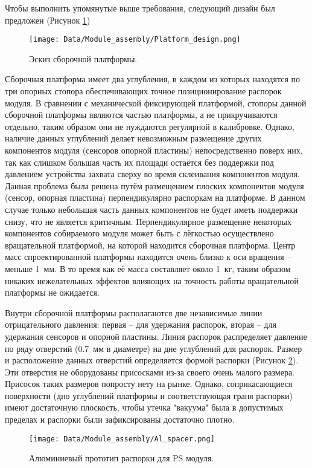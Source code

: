 Чтобы выполнить упомянутые выше требования, следующий дизайн был предложен (Рисунок \ref{fig:platform_design})

\begin{figure}[ht]\centering
\texttt{[image: Data/Module\_assembly/Platform\_design.png]}
\caption{Эскиз сборочной платформы.}
\label{fig:platform_design}
\end{figure}

Сборочная платформа имеет два углубления, в каждом из которых находятся по три опорных стопора обеспечивающих точное позиционирование распорок модуля. В сравнении с механической фиксирующей платформой, стопоры данной сборочной платформы являются частью платформы, а не прикручиваются отдельно, таким образом они не нуждаются регулярной в калибровке. Однако, наличие данных углублений делает невозможным размещение других компонентов модуля (сенсоров опорной пластины) непосредственно поверх них, так как слишком большая часть их площади остаётся без поддержки под давлением устройства захвата сверху во время склеивания компонентов модуля. Данная проблема была решена путём размещением плоских компонентов модуля (сенсор, опорная пластина) перпендикулярно распоркам на платформе. В данном случае только небольшая часть данных компонентов не будет иметь поддержки снизу, что не является критичным. Перпендикулярное размещение некоторых компонентов собираемого модуля может быть с лёгкостью осуществлено вращательной платформой, на которой находится сборочная платформа. Центр масс спроектированной платформы находится очень близко к оси вращения -- меньше 1~мм. В то время как её масса составляет около 1~кг, таким образом никаких нежелательных эффектов влияющих на точность работы вращательной платформы не ожидается.

Внутри сборочной платформы располагаются две независимые линии отрицательного давления: первая -- для удержания распорок, вторая -- для удержания сенсоров и опорной пластины. Линия распорок распределяет давление по ряду отверстий (0.7~мм в диаметре) на дне углублений для распорок. Размер и расположение данных отверстий определяется формой распорки (Рисунок \ref{fig:al_spacer}). Эти отверстия не оборудованы присосками из-за своего очень малого размера. Присосок таких размеров попросту нету на рынке. Однако, соприкасающиеся поверхности (дно углублений платформы и соответствующая граня распорки) имеют достаточную плоскость, чтобы утечка "вакуума" была в допустимых пределах и распорки были зафиксированы достаточно плотно.

\begin{figure}[ht]\centering
\texttt{[image: Data/Module\_assembly/Al\_spacer.png]}
\caption{Алюминиевый прототип распорки для PS модуля.}
\label{fig:al_spacer}
\end{figure}

